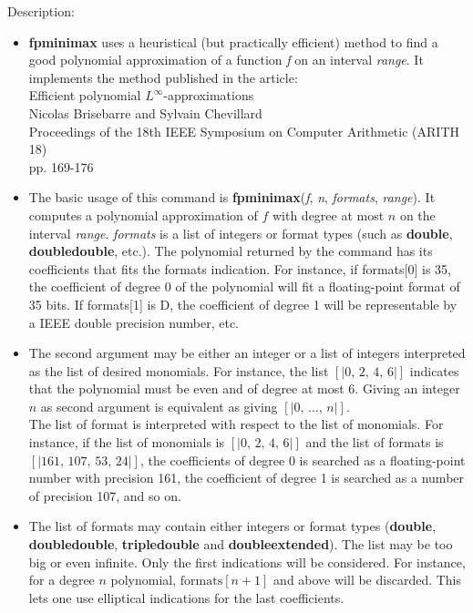 \noindent Description: \begin{itemize}

\item \textbf{fpminimax} uses a heuristical (but practically efficient) method to find a good
   polynomial approximation of a function \emph{f} on an interval \emph{range}. It 
   implements the method published in the article:\\
   Efficient polynomial $L^\infty$-approximations\\ 
   Nicolas Brisebarre and Sylvain Chevillard\\
   Proceedings of the 18th IEEE Symposium on Computer Arithmetic (ARITH 18)\\
   pp. 169-176

\item The basic usage of this command is \textbf{fpminimax}(\emph{f}, \emph{n}, \emph{formats}, \emph{range}).
   It computes a polynomial approximation of $f$ with degree at most $n$
   on the interval \emph{range}. \emph{formats} is a list of integers or format types 
   (such as \textbf{double}, \textbf{doubledouble}, etc.). The polynomial returned by the
   command has its coefficients that fits the formats indication. For 
   instance, if formats[0] is 35, the coefficient of degree 0 of the 
   polynomial will fit a floating-point format of 35 bits. If formats[1] 
   is D, the coefficient of degree 1 will be representable by a IEEE double
   precision number, etc.

\item The second argument may be either an integer or a list of integers
   interpreted as the list of desired monomials. For instance, the list
   $[|0,\,2,\,4,\,6|]$ indicates that the polynomial must be even and of
   degree at most 6. Giving an integer $n$ as second argument is equivalent
   as giving $[|0,\,\dots,\,n|]$.\\
   The list of format is interpreted with respect to the list of monomials. For
   instance, if the list of monomials is $[|0,\,2,\,4,\,6|]$ and the list
   of formats is $[|161,\,107,\,53,\,24|]$, the coefficients of degree 0 is 
   searched as a floating-point number with precision 161, the coefficient of 
   degree 1 is searched as a number of precision 107, and so on.

\item The list of formats may contain either integers or format types (\textbf{double},
   \textbf{doubledouble}, \textbf{tripledouble} and \textbf{doubleextended}). The list may be too big
   or even infinite. Only the first indications will be considered. For 
   instance, for a degree $n$ polynomial, $\mathrm{formats}[n+1]$ and above will
   be discarded. This lets one use elliptical indications for the last
   coefficients.


\end{itemize}
